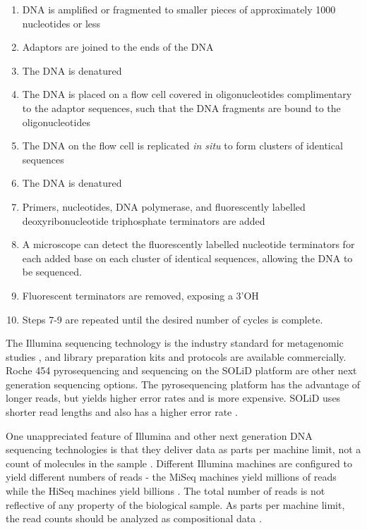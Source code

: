 \begin{enumerate}
\item DNA is amplified or fragmented to smaller pieces of approximately 1000 nucleotides or less
\item Adaptors are joined to the ends of the DNA
\item The DNA is denatured
\item The DNA is placed on a flow cell covered in oligonucleotides complimentary to the adaptor sequences, such that the DNA fragments are bound to the oligonucleotides
\item The DNA on the flow cell is replicated \textit{in situ} to form clusters of identical sequences
\item The DNA is denatured
\item Primers, nucleotides, DNA polymerase, and fluorescently labelled deoxyribonucleotide triphosphate terminators are added
\item A microscope can detect the fluorescently labelled nucleotide terminators for each added base on each cluster of identical sequences, allowing the DNA to be sequenced.
\item Fluorescent terminators are removed, exposing a 3'OH
\item Steps 7-9 are repeated until the desired number of cycles is complete.
\end{enumerate}

The Illumina sequencing technology is the industry standard for metagenomic studies \cite{bentley2008accurate}, and library preparation kits and protocols are available commercially. Roche 454 pyrosequencing \cite{margulies2005genome} and sequencing on the SOLiD platform \cite{shendure2005accurate} \cite{mckernan2009reagents} are other next generation sequencing options. The pyrosequencing platform has the advantage of longer reads, but yields higher error rates and is more expensive. SOLiD uses shorter read lengths and also has a higher error rate \cite{mardis2008next} \cite{shendure2008next}.

One unappreciated feature of Illumina and other next generation DNA sequencing technologies is that they deliver data as parts per machine limit, not a count of molecules in the sample \cite{fernandes2013anova} \cite{fernandes2014unifying} \cite{gloor2010microbiome} \cite{gloor2016compositional} \cite{gloor2016s}. Different Illumina machines are configured to yield different numbers of reads - the MiSeq machines yield millions of reads while the HiSeq machines yield billions \cite{caporaso2012ultra}. The total number of reads is not reflective of any property of the biological sample. As parts per machine limit, the read counts should be analyzed as compositional data \cite{aitchison1982statistical}.

